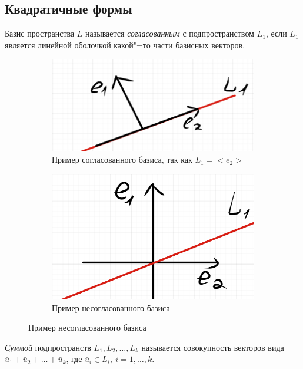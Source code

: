 \subsection*{Квадратичные формы}
\begin{definition}
  Базис пространства $L$ называется \textit{согласованным} с подпространством $L_1$, если $L_1$ является линейной оболочкой какой"=то части базисных векторов.
\end{definition}
\begin{figure}[H]
  \centering
  \begin{subfigure}[b]{0.4\textwidth}
    \centering
    \includegraphics[width = \textwidth]{images/map_form_soglBasis.png}
    \caption{Пример согласованного базиса, так как $L_1 = <\!e_2\!>$}
  \end{subfigure}
  \hfill
  \begin{subfigure}[b]{0.4\textwidth}
    \centering
    \includegraphics[width = \textwidth]{images/map_form_NesoglBasis.png}
    \caption{Пример несогласованного базиса}
  \end{subfigure}
\end{figure}

\begin{definition}
  \textit{Суммой} подпространств $L_1,L_2, \ldots, L_k$ называется совокупность векторов вида $\bar{u}_1 + \bar{u}_2 + \ldots + \bar{u}_k$, где $\bar{u}_i \in L_i,~ i = 1,\ldots,k.$
\end{definition}


